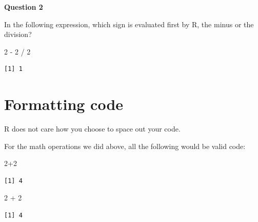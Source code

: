 \documentclass[
  letterpaper,
  DIV=11,
  numbers=noendperiod]{scrreprt}
\newenvironment{Shaded}{\begin{snugshade}}{\end{snugshade}}
\newcommand{\DecValTok}[1]{\textcolor[rgb]{0.68,0.00,0.00}{#1}}
\newcommand{\SpecialCharTok}[1]{\textcolor[rgb]{0.37,0.37,0.37}{#1}}
\begin{document}
\begin{tcolorbox}[enhanced jigsaw, titlerule=0mm, colback=white, left=2mm, breakable, opacitybacktitle=0.6, colbacktitle=quarto-callout-tip-color!10!white, colframe=quarto-callout-tip-color-frame, bottomtitle=1mm, opacityback=0, coltitle=black, arc=.35mm, toptitle=1mm, title=\textcolor{quarto-callout-tip-color}{\faLightbulb}\hspace{0.5em}{Practice}, leftrule=.75mm, toprule=.15mm, bottomrule=.15mm, rightrule=.15mm]

\textbf{Question 2}

In the following expression, which sign is evaluated first by R, the
minus or the division?

\begin{Shaded}
\begin{Highlighting}[]
\DecValTok{2} \SpecialCharTok{{-}} \DecValTok{2} \SpecialCharTok{/} \DecValTok{2}
\end{Highlighting}
\end{Shaded}

\begin{verbatim}
[1] 1
\end{verbatim}

\end{tcolorbox}

\section{Formatting code}\label{formatting-code}

R does not care how you choose to space out your code.

For the math operations we did above, all the following would be valid
code:

\begin{Shaded}
\begin{Highlighting}[]
\DecValTok{2}\SpecialCharTok{+}\DecValTok{2}
\end{Highlighting}
\end{Shaded}

\begin{verbatim}
[1] 4
\end{verbatim}

\begin{Shaded}
\begin{Highlighting}[]
\DecValTok{2} \SpecialCharTok{+} \DecValTok{2}
\end{Highlighting}
\end{Shaded}

\begin{verbatim}
[1] 4
\end{verbatim}
\end{document}
